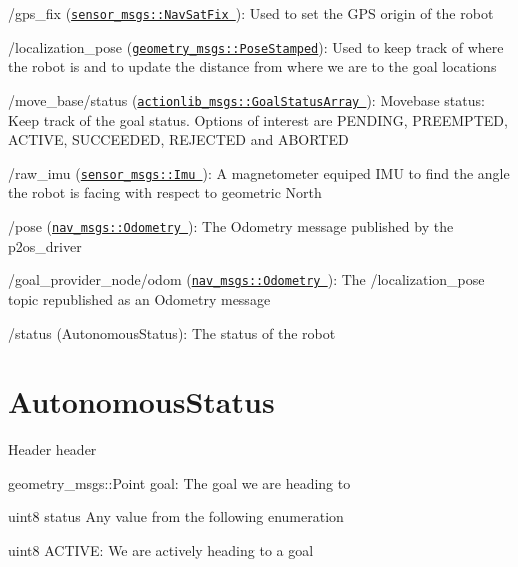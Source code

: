 \begin{DoxyItemize}
\item {\ttfamily /gps\-\_\-fix} (\href{http://ros.org/doc/api/sensor_msgs/html/msg/NavSatFix.html}{\tt sensor\-\_\-msgs\-::\-Nav\-Sat\-Fix })\-: \-Used to set the \-G\-P\-S origin of the robot
\item {\ttfamily /localization\-\_\-pose} (\href{http://ros.org/doc/api/geometry_msgs/html/msg/PoseStamped.html}{\tt geometry\-\_\-msgs\-::\-Pose\-Stamped})\-: \-Used to keep track of where the robot is and to update the distance from where we are to the goal locations
\item {\ttfamily /move\-\_\-base/status} (\href{http://docs.ros.org/api/actionlib_msgs/html/msg/GoalStatusArray.html}{\tt actionlib\-\_\-msgs\-::\-Goal\-Status\-Array })\-: \-Movebase status\-: \-Keep track of the goal status. \-Options of interest are \-P\-E\-N\-D\-I\-N\-G, \-P\-R\-E\-E\-M\-P\-T\-E\-D, \-A\-C\-T\-I\-V\-E, \-S\-U\-C\-C\-E\-E\-D\-E\-D, \-R\-E\-J\-E\-C\-T\-E\-D and \-A\-B\-O\-R\-T\-E\-D
\item {\ttfamily /raw\-\_\-imu} (\href{http://ros.org/doc/api/sensor_msgs/html/msg/Imu.html}{\tt sensor\-\_\-msgs\-::\-Imu })\-: \-A magnetometer equiped \-I\-M\-U to find the angle the robot is facing with respect to geometric \-North
\item {\ttfamily /pose} (\href{http://ros.org/doc/api/nav_msgs/html/msg/Odometry.html}{\tt nav\-\_\-msgs\-::\-Odometry })\-: \-The \-Odometry message published by the p2os\-\_\-driver
\item {\ttfamily /goal\-\_\-provider\-\_\-node/odom} (\href{http://ros.org/doc/api/nav_msgs/html/msg/Odometry.html}{\tt nav\-\_\-msgs\-::\-Odometry })\-: \-The /localization\-\_\-pose topic republished as an \-Odometry message
\item {\ttfamily /status} (\-Autonomous\-Status)\-: \-The status of the robot
\end{DoxyItemize}\hypertarget{index_autostatus}{}\section{\-Autonomous\-Status}\label{index_autostatus}
\-Header header

geometry\-\_\-msgs\-::\-Point goal\-: \-The goal we are heading to

uint8 status \-Any value from the following enumeration


\begin{DoxyItemize}
\item uint8 \-A\-C\-T\-I\-V\-E\-: \-We are actively heading to a goal
\end{DoxyItemize}


